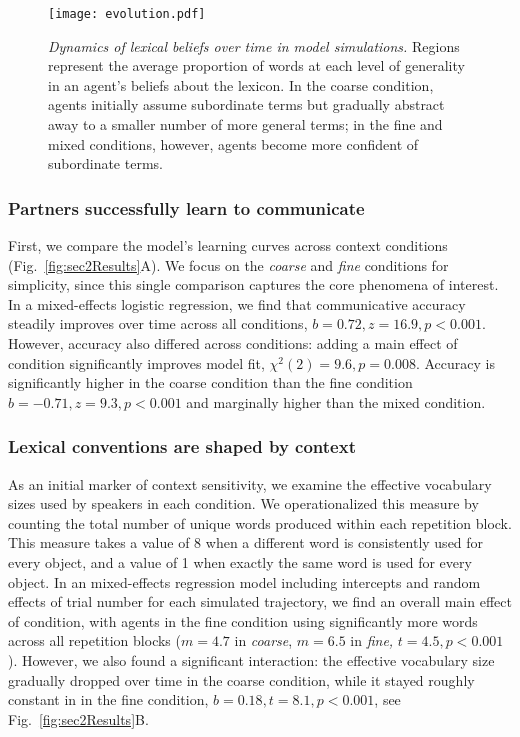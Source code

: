 \begin{figure}[h]
\begin{center}
\texttt{[image: evolution.pdf]}
\caption{\emph{Dynamics of lexical beliefs over time in model simulations.} Regions represent the average proportion of words at each level of generality in an agent's beliefs about the lexicon. In the coarse condition, agents initially assume subordinate terms but gradually abstract away to a smaller number of more general terms; in the fine and mixed conditions, however, agents become more confident of subordinate terms.}
\label{fig:evolution}
\end{center}
\end{figure}

\subsubsection{Partners successfully learn to communicate}

First, we compare the model's learning curves across context conditions (Fig.~\ref{fig:sec2Results}A). 
We focus on the \emph{coarse} and \emph{fine} conditions for simplicity, since this single comparison captures the core phenomena of interest.
In a mixed-effects logistic regression, we find that communicative accuracy steadily improves over time across all conditions, $b=0.72, z = 16.9, p<0.001$.
However, accuracy also differed across conditions: adding a main effect of condition significantly improves model fit, $\chi^2(2) = 9.6, p = 0.008$. 
Accuracy is significantly higher in the coarse condition than the fine condition $b=-0.71, z=9.3, p <0.001$ and marginally higher than the mixed condition.

\subsubsection{Lexical conventions are shaped by context}

As an initial marker of context sensitivity, we examine the effective vocabulary sizes used by speakers in each condition.
We operationalized this measure by counting the total number of unique words produced within each repetition block.
This measure takes a value of 8 when a different word is consistently used for every object, and a value of 1 when exactly the same word is used for every object.
In an mixed-effects regression model including intercepts and random effects of trial number for each simulated trajectory, we find an overall main effect of condition, with agents in the fine condition using significantly more words across all repetition blocks ($m = 4.7$ in \emph{coarse}, $m=6.5$ in \emph{fine,} $t = 4.5, p < 0.001$).
However, we also found a significant interaction: the effective vocabulary size gradually dropped over time in the coarse condition, while it stayed roughly constant in in the fine condition, $b = 0.18, t = 8.1, p < 0.001$, see Fig.~\ref{fig:sec2Results}B.


